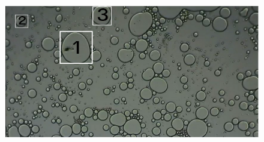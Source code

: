 \begin{figure}[h!]
  \begin{center}
    \includegraphics[width=\textwidth]{3_2.png}
  \end{center}
  \caption[Poem]{}
\end{figure}
